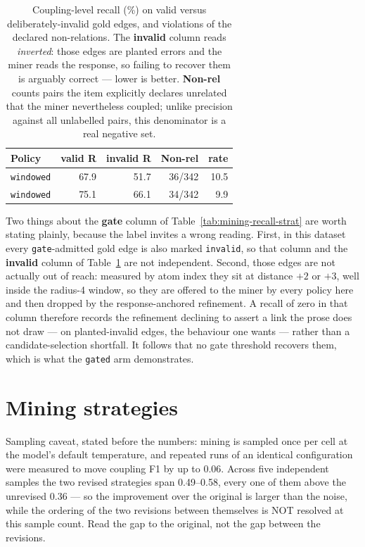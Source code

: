 \documentclass[11pt]{article}
\begin{document}
\begin{table}[htbp]
\centering
\small
\caption{Coupling-level recall (\%) on valid versus deliberately-invalid gold edges, and violations of the declared non-relations. The \textbf{invalid} column reads \emph{inverted}: those edges are planted errors and the miner reads the response, so failing to recover them is arguably correct --- lower is better. \textbf{Non-rel} counts pairs the item explicitly declares unrelated that the miner nevertheless coupled; unlike precision against all unlabelled pairs, this denominator is a real negative set.}
\label{tab:mining-validity}
\begin{tabular}{lrrrr}
\toprule
Policy & valid R & invalid R & Non-rel & rate \\
\midrule
\texttt{windowed} & 67.9 & 51.7 & 36/342 & 10.5 \\
\texttt{windowed} & 75.1 & 66.1 & 34/342 & 9.9 \\
\bottomrule
\end{tabular}
\end{table}

Two things about the \textbf{gate} column of Table~\ref{tab:mining-recall-strat} are worth stating plainly, because the label invites a wrong reading. First, in this dataset every \texttt{gate}-admitted gold edge is also marked \texttt{invalid}, so that column and the \textbf{invalid} column of Table~\ref{tab:mining-validity} are not independent. Second, those edges are not actually out of reach: measured by atom index they sit at distance $+2$ or $+3$, well inside the radius-4 window, so they are offered to the miner by every policy here and then dropped by the response-anchored refinement. A recall of zero in that column therefore records the refinement declining to assert a link the prose does not draw --- on planted-invalid edges, the behaviour one wants --- rather than a candidate-selection shortfall. It follows that no gate threshold recovers them, which is what the \texttt{gated} arm demonstrates.

\section{Mining strategies}\label{sec:strategies}

Sampling caveat, stated before the numbers: mining is sampled once per cell at the model's default temperature, and repeated runs of an identical configuration were measured to move coupling F1 by up to 0.06. Across five independent samples the two revised strategies span 0.49--0.58, every one of them above the unrevised 0.36 --- so the improvement over the original is larger than the noise, while the ordering of the two revisions between themselves is NOT resolved at this sample count. Read the gap to the original, not the gap between the revisions.
\end{document}
